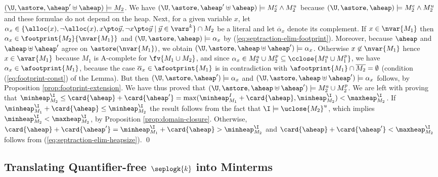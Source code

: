 {  \noindent
  $\underline{(\U,\astore,\aheap' \uplus \aheap) \models M_2}$. We
  have $(\U,\astore,\aheap'\uplus\aheap) \models %
  M_2^e
  \wedge M_2^u$ because $(\U,\astore,\aheap) \models %
  M_2^e \wedge M_2^u$ and these formulae do not depend on the
  heap. Next, for a given variable $x$, let $\alpha_x \in \{\alloc(x),
  \neg\alloc(x), x \pto \vec{y}, \neg x \pto \vec{y} \mid \vec{y} \in
  \vars^k\} \cap M_2$ be a literal and let $\overline{\alpha}_x$
  denote its complement. If $x \in \nvar{M_1}$ then $\alpha_x \in
  \footprint{M_2}{\nvar{M_1}}$ and $(\U,\astore,\aheap) \models
  \alpha_x$ by (\ref{eq:septraction-elim-footprint}). Moreover,
  because $\aheap$ and $\aheap \uplus \aheap'$ agree on
  $\astore(\nvar{M_1})$, we obtain $(\U,\astore,\aheap\uplus\aheap')
  \models \alpha_x$. Otherwise $x \not\in \nvar{M_1}$ hence $x \in
  \avar{M_1}$ because $M_1$ is A-complete for $\fv{M_1 \cup M_2}$, and
  since $\alpha_x \in M_2^a \cup M_2^p \subseteq \cclose{M_1^a \cup
    M_1^p}$, we have $\alpha_x \in \afootprint{M_1}$, because the case
  $\overline{\alpha}_x \in \afootprint{M_1}$ is in contradiction with
  $\afootprint{M_1}\cap \overline{M_2} = \emptyset$ (condition
  (\ref{eq:footprint-const}) of the Lemma).  But then
  $(\U,\astore,\aheap') \models \alpha_x$ and
  $(\U,\astore,\aheap\uplus\aheap') \models \alpha_x$ follows, by
  Proposition \ref{prop:footprint-extension}. We have thus proved that
  $(\U,\astore,\aheap\uplus\aheap') \models M_2^a \cup M_2^p$. We are
  left with proving that $\minheap^\I_{M_2} \leq \card{\aheap} +
  \card{\aheap'} = \max(\minheap^I_{M_1} + \card{\aheap},
  \minheap^\I_{M_2}) < \maxheap^\I_{M_2}$. If $\minheap^\I_{M_1} +
  \card{\aheap} \leq \minheap^\I_{M_2}$ the result follows from the
  fact that $\I \models \uclose{M_2}^u$, which implies
  $\minheap_{M_2}^\I < \maxheap_{M_2}^\I$, by Proposition
  \ref{prop:domain-closure}. Otherwise, $\card{\aheap} +
  \card{\aheap'} = \minheap^\I_{M_1} + \card{\aheap} >
  \minheap^\I_{M_2}$ and $\card{\aheap} + \card{\aheap'} <
  \maxheap^\I_{M_2}$ follows from
  (\ref{eq:septraction-elim-heapsize}). \qed}

\subsection{Translating Quantifier-free $\seplogk{k}$ into Minterms}

